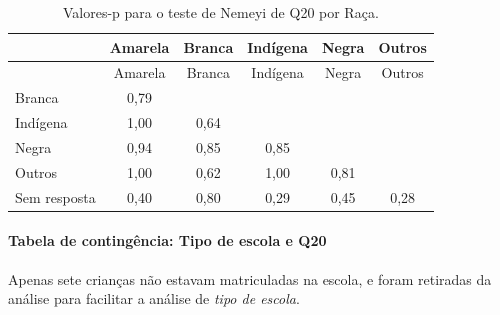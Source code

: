 \documentclass[]{article}
\let\oldparagraph\paragraph
\renewcommand{\paragraph}[1]{\oldparagraph{#1}\mbox{}}
\begin{document}
\begin{longtable}[]{@{}lccccc@{}}
\caption{\label{tab:unnamed-chunk-405}Valores-p para o teste de Nemeyi de Q20 por Raça.}\tabularnewline
\toprule
& Amarela & Branca & Indígena & Negra & Outros\tabularnewline
\midrule
\endfirsthead
\toprule
& Amarela & Branca & Indígena & Negra & Outros\tabularnewline
\midrule
\endhead
Branca & 0,79 & & & &\tabularnewline
Indígena & 1,00 & 0,64 & & &\tabularnewline
Negra & 0,94 & 0,85 & 0,85 & &\tabularnewline
Outros & 1,00 & 0,62 & 1,00 & 0,81 &\tabularnewline
Sem resposta & 0,40 & 0,80 & 0,29 & 0,45 & 0,28\tabularnewline
\bottomrule
\end{longtable}

\cleardoublepage

\hypertarget{tabela-de-continguxeancia-tipo-de-escola-e-q20}{%
\paragraph{Tabela de contingência: Tipo de escola e Q20}\label{tabela-de-continguxeancia-tipo-de-escola-e-q20}}

Apenas sete crianças não estavam matriculadas na escola, e foram retiradas da análise para facilitar a análise de \emph{tipo de escola}.
\end{document}
